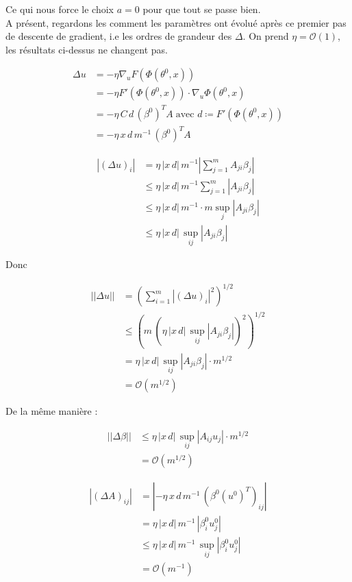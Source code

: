 \documentclass[a4paper, 11pt, french]{article}
\begin{document}
\begin{itemize}
		Ce qui nous force le choix $a = 0$ pour que tout se passe bien. \\
		
		A présent, regardons les comment les paramètres ont évolué après ce premier pas de descente de gradient, i.e les ordres de grandeur des $\Delta$.
		On prend $\eta = \mathcal{O}(1)$, les résultats ci-dessus ne changent pas.

		
		 \begin{align*}
		 	\Delta u &= - \eta \nabla_u F(\Phi(\theta^0, x)) \\
		 	&= - \eta F'(\Phi(\theta^0, x)) \cdot \nabla_{u} \Phi(\theta^0, x) \\
		 	&= -\eta \, C \, d \, (\beta^0)^T A \; \text{avec $d \coloneqq F'(\Phi(\theta^0, x))$} \\
		 	&= -\eta \, x \, d \, m^{-1} \, (\beta^0)^T A
		 \end{align*}
	 
	 	\begin{align*}
	 		| (\Delta u)_i | &= \eta \, |x \, d| \, m^{-1} 
	 		\left| \sum_{j = 1}^{m} A_{ji} \beta_j \right| \\
	 		&\leq \eta \, |x \, d| \, m^{-1} \sum_{j = 1}^{m} | A_{ji} \beta_j | \\
	 		&\leq  \eta \, |x \, d| \, m^{-1} \cdot m \sup_j | A_{ji} \beta_j | \\
	 		&\leq \eta \, |x \, d| \, \sup_{ij} | A_{ji} \beta_j |
	 	\end{align*}
 	
 		Donc
 		
 		\begin{align*}
 			|| \Delta u|| &= \left( \sum_{i = 1}^{m} | (\Delta u)_i |^2 \right)^{1/2} \\
 			&\leq ( m \, (\eta \, |x \, d| \, \sup_{ij} | A_{ji} \beta_j | )^2 )^{1/2} \\
 			&= \eta \, |x \, d| \, \sup_{ij} | A_{ji} \beta_j | \cdot m^{1/2} \\
 			&= \mathcal{O}(m^{1/2})
 		\end{align*}
		
		De la même manière :
		
		\begin{align*}
 			||\Delta \beta|| &\leq \eta \, |x \, d| \, \sup_{ij} | A_{ij} u_j | \cdot m^{1/2} \\
			&= \mathcal{O}(m^{1/2})
		\end{align*}
	
		\begin{align*}
			|(\Delta A)_{ij}| &= | -\eta \, x \, d \, m^{-1} \, (\beta^0 (u^0)^T)_{ij} | \\
			&= \eta \, |x \, d| \, m^{-1} \, |\beta^0_i u^0_j| \\
			&\leq \eta \, |x \, d| \, m^{-1} \, \sup_{ij} |\beta^0_i u^0_j| \\
			&= \mathcal{O}(m^{-1})
		\end{align*}
	

\end{itemize}
\end{document}
